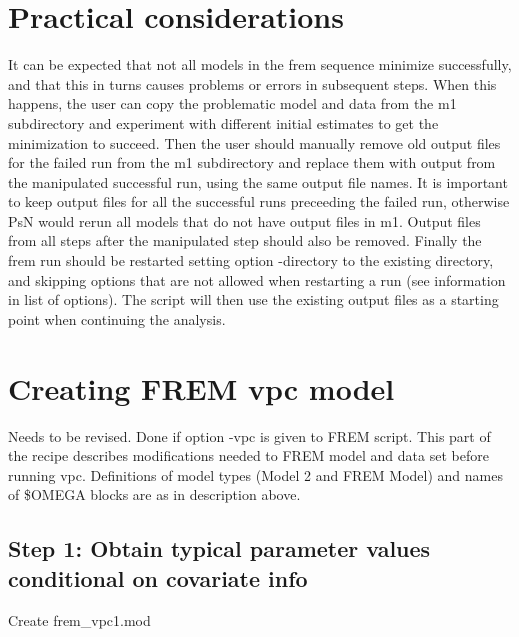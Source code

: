 \section{Practical considerations}
It can be expected that not all models in the frem sequence minimize successfully, and that this in turns 
causes problems or errors in subsequent steps. 
When this happens, the user can copy the problematic model and data from the m1 subdirectory and experiment with
different initial estimates to get the minimization to succeed. Then the user should manually remove old output files for the
failed run from the m1 subdirectory and replace them with output from the manipulated successful run, using the same 
output file names. It is important to keep output files for all the successful runs preceeding the failed run, 
otherwise PsN would rerun all models that do not have output files
in m1. Output files from all steps after the manipulated step should also be removed.
Finally the frem run should be restarted setting option -directory to the existing directory, and skipping 
options that are not allowed when restarting a run (see information in list of options). The script
will then use the existing output files as a starting point when continuing the analysis.


\section{Creating FREM vpc model}
Needs to be revised.
Done if option -vpc is given to FREM script. This part of the recipe describes modifications needed to FREM model and data set before running vpc. Definitions of model types (Model 2 and FREM Model) and names of \$OMEGA blocks are as in description above. 

\subsection{Step 1: Obtain typical parameter values conditional on covariate info}
Create frem\_vpc1.mod

